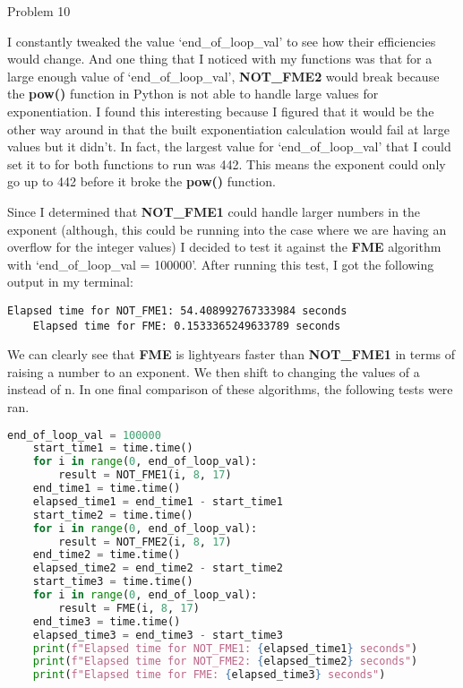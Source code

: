 \begin{problem}{Problem 10}
\begin{highlight}[Solution]
        I constantly tweaked the value `end\_of\_loop\_val' to see how their efficiencies would change. And one thing that I noticed with my functions was that for a large enough value of 
        `end\_of\_loop\_val', \textbf{NOT\_FME2} would break because the \textbf{pow()} function in Python is not able to handle large values for exponentiation. I found this interesting because
        I figured that it would be the other way around in that the built exponentiation calculation would fail at large values but it didn't. In fact, the largest value for `end\_of\_loop\_val'
        that I could set it to for both functions to run was 442. This means the exponent could only go up to 442 before it broke the \textbf{pow()} function.

        Since I determined that \textbf{NOT\_FME1} could handle larger numbers in the exponent (although, this could be running into the case where we are having an overflow for the integer values)
        I decided to test it against the \textbf{FME} algorithm with `end\_of\_loop\_val = 100000'. After running this test, I got the following output in my terminal:
    \begin{lstlisting}[style=stackoverflow]
    Elapsed time for NOT_FME1: 54.408992767333984 seconds
    Elapsed time for FME: 0.1533365249633789 seconds
    \end{lstlisting}

        We can clearly see that \textbf{FME} is lightyears faster than \textbf{NOT\_FME1} in terms of raising a number to an exponent. We then shift to changing the values of a instead of n. In one final comparison of
        these algorithms, the following tests were ran.
    \begin{lstlisting}[style=stackoverflow, language=python]
    end_of_loop_val = 100000
    start_time1 = time.time()
    for i in range(0, end_of_loop_val):
        result = NOT_FME1(i, 8, 17)
    end_time1 = time.time()
    elapsed_time1 = end_time1 - start_time1
    start_time2 = time.time()
    for i in range(0, end_of_loop_val):
        result = NOT_FME2(i, 8, 17)
    end_time2 = time.time()
    elapsed_time2 = end_time2 - start_time2
    start_time3 = time.time()
    for i in range(0, end_of_loop_val):
        result = FME(i, 8, 17)
    end_time3 = time.time()
    elapsed_time3 = end_time3 - start_time3
    print(f"Elapsed time for NOT_FME1: {elapsed_time1} seconds")
    print(f"Elapsed time for NOT_FME2: {elapsed_time2} seconds")
    print(f"Elapsed time for FME: {elapsed_time3} seconds")
    \end{lstlisting}
        

\end{highlight}
\end{problem}
